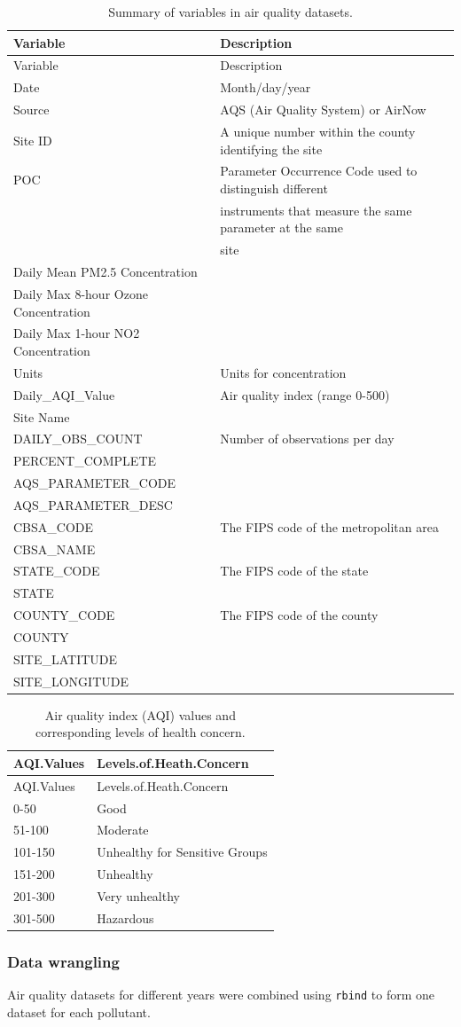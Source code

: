 \documentclass[12pt,]{article}
\begin{document}
\begin{longtable}[]{@{}ll@{}}
\caption{Summary of variables in air quality datasets.}\tabularnewline
\toprule
Variable & Description\tabularnewline
\midrule
\endfirsthead
\toprule
Variable & Description\tabularnewline
\midrule
\endhead
Date & Month/day/year\tabularnewline
Source & AQS (Air Quality System) or AirNow\tabularnewline
Site ID & A unique number within the county identifying the
site\tabularnewline
POC & Parameter Occurrence Code used to distinguish
different\tabularnewline
& instruments that measure the same parameter at the same\tabularnewline
& site\tabularnewline
Daily Mean PM2.5 Concentration &\tabularnewline
Daily Max 8-hour Ozone Concentration &\tabularnewline
Daily Max 1-hour NO2 Concentration &\tabularnewline
Units & Units for concentration\tabularnewline
Daily\_AQI\_Value & Air quality index (range 0-500)\tabularnewline
Site Name &\tabularnewline
DAILY\_OBS\_COUNT & Number of observations per day\tabularnewline
PERCENT\_COMPLETE &\tabularnewline
AQS\_PARAMETER\_CODE &\tabularnewline
AQS\_PARAMETER\_DESC &\tabularnewline
CBSA\_CODE & The FIPS code of the metropolitan area\tabularnewline
CBSA\_NAME &\tabularnewline
STATE\_CODE & The FIPS code of the state\tabularnewline
STATE &\tabularnewline
COUNTY\_CODE & The FIPS code of the county\tabularnewline
COUNTY &\tabularnewline
SITE\_LATITUDE &\tabularnewline
SITE\_LONGITUDE &\tabularnewline
\bottomrule
\end{longtable}

\begin{longtable}[]{@{}ll@{}}
\caption{Air quality index (AQI) values and corresponding levels of
health concern.}\tabularnewline
\toprule
AQI.Values & Levels.of.Heath.Concern\tabularnewline
\midrule
\endfirsthead
\toprule
AQI.Values & Levels.of.Heath.Concern\tabularnewline
\midrule
\endhead
0-50 & Good\tabularnewline
51-100 & Moderate\tabularnewline
101-150 & Unhealthy for Sensitive Groups\tabularnewline
151-200 & Unhealthy\tabularnewline
201-300 & Very unhealthy\tabularnewline
301-500 & Hazardous\tabularnewline
\bottomrule
\end{longtable}

\hypertarget{data-wrangling}{%
\subsubsection{Data wrangling}\label{data-wrangling}}

Air quality datasets for different years were combined using
\texttt{rbind} to form one dataset for each pollutant.
\end{document}
